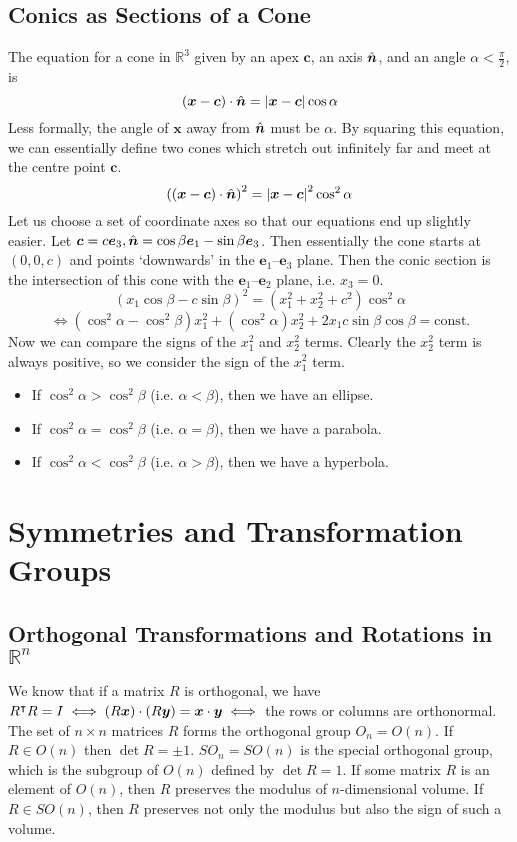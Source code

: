 \documentclass{article}
\begin{document}
	\subsection{Conics as Sections of a Cone}
	The equation for a cone in $\mathbb R^3$ given by an apex $\bm c$, an axis $\hat{\bm n}$, and an angle $\alpha < \frac{\pi}{2}$, is
	\[ (\bm x - \bm c)\cdot\hat{\bm n} = \abs{\bm x - \bm c}\cos \alpha \]
	Less formally, the angle of $\bm x$ away from $\hat{\bm n}$ must be $\alpha$. By squaring this equation, we can essentially define two cones which stretch out infinitely far and meet at the centre point $\bm c$.
	\[ \left( (\bm x - \bm c)\cdot\hat{\bm n} \right)^2 = \abs{\bm x - \bm c}^2\cos^2 \alpha \]
	Let us choose a set of coordinate axes so that our equations end up slightly easier. Let $\bm c = c\bm e_3, \hat{\bm n} = \cos\beta \bm e_1 - \sin\beta \bm e_3$. Then essentially the cone starts at $(0, 0, c)$ and points `downwards' in the $\bm e_1$--$\bm e_3$ plane. Then the conic section is the intersection of this cone with the $\bm e_1$--$\bm e_2$ plane, i.e. $x_3 = 0$.
	\[ (x_1\cos\beta - c\sin\beta)^2 = (x_1^2 + x_2^2 + c^2)\cos^2\alpha \]
	\[ \iff (\cos^2\alpha - \cos^2\beta)x_1^2 + (\cos^2\alpha)x_2^2 + 2x_1c\sin\beta\cos\beta = \text{const.} \]
	Now we can compare the signs of the $x_1^2$ and $x_2^2$ terms. Clearly the $x_2^2$ term is always positive, so we consider the sign of the $x_1^2$ term.
	\begin{itemize}
		\item If $\cos^2 \alpha > \cos^2\beta$ (i.e. $\alpha < \beta$), then we have an ellipse.
		\item If $\cos^2 \alpha = \cos^2\beta$ (i.e. $\alpha = \beta$), then we have a parabola.
		\item If $\cos^2 \alpha < \cos^2\beta$ (i.e. $\alpha > \beta$), then we have a hyperbola.
	\end{itemize}

	\section{Symmetries and Transformation Groups}
	\subsection{Orthogonal Transformations and Rotations in $\mathbb R^n$}
	We know that if a matrix $R$ is orthogonal, we have $R^\intercal R = I \iff (R\bm x) \cdot (R\bm y) = \bm x \cdot \bm y \iff$ the rows or columns are orthonormal. The set of $n \times n$ matrices $R$ forms the orthogonal group $O_n = O(n)$. If $R \in O(n)$ then $\det R = \pm 1$. $SO_n = SO(n)$ is the special orthogonal group, which is the subgroup of $O(n)$ defined by $\det R = 1$. If some matrix $R$ is an element of $O(n)$, then $R$ preserves the modulus of $n$-dimensional volume. If $R \in SO(n)$, then $R$ preserves not only the modulus but also the sign of such a volume.
\end{document}
